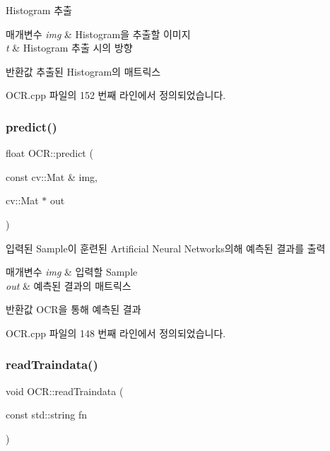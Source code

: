 Histogram 추출 


\begin{DoxyParams}{매개변수}
{\em img} & Histogram을 추출할 이미지 \\
\hline
{\em t} & Histogram 추출 시의 방향 \\
\hline
\end{DoxyParams}
\begin{DoxyReturn}{반환값}
추출된 Histogram의 매트릭스 
\end{DoxyReturn}


O\+C\+R.\+cpp 파일의 152 번째 라인에서 정의되었습니다.

\mbox{\label{class_o_c_r_aee086012d86e877ac029cdde3927a221}} 
\subsubsection{\texorpdfstring{predict()}{predict()}}
{\footnotesize\ttfamily float O\+C\+R\+::predict (\begin{DoxyParamCaption}\item[{const cv\+::\+Mat \&}]{img,  }\item[{cv\+::\+Mat $\ast$}]{out }\end{DoxyParamCaption})}



입력된 Sample이 훈련된 Artificial Neural Networks의해 예측된 결과를 출력 


\begin{DoxyParams}{매개변수}
{\em img} & 입력할 Sample \\
\hline
{\em out} & 예측된 결과의 매트릭스 \\
\hline
\end{DoxyParams}
\begin{DoxyReturn}{반환값}
O\+C\+R을 통해 예측된 결과 
\end{DoxyReturn}


O\+C\+R.\+cpp 파일의 148 번째 라인에서 정의되었습니다.

\mbox{\label{class_o_c_r_a27494f2dca260d6710c332897c31f716}} 
\subsubsection{\texorpdfstring{read\+Traindata()}{readTraindata()}\hspace{0.1cm}{\footnotesize\ttfamily [1/2]}}
{\footnotesize\ttfamily void O\+C\+R\+::read\+Traindata (\begin{DoxyParamCaption}\item[{const std\+::string}]{fn }\end{DoxyParamCaption})\hspace{0.3cm}{\ttfamily [private]}}



